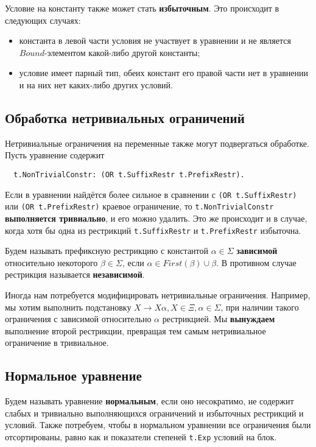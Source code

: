 \documentclass[12pt]{article}
\begin{document}
Условие на константу также может стать \textbf{избыточным}. Это происходит в
следующих случаях:
\begin{itemize}
  \item константа в левой части условия не участвует в уравнении и не является
  $Bound$-элементом какой-либо другой константы;
  \item условие имеет парный тип, обеих констант его правой части нет в
  уравнении и на них нет каких-либо других условий.
\end{itemize}

\subsection{Обработка нетривиальных ограничений}

Нетривиальные ограничения на переменные также могут подвергаться обработке.
Пусть уравнение содержит
\begin{Verbatim}
  t.NonTrivialConstr: (OR t.SuffixRestr t.PrefixRestr).
\end{Verbatim}
Если в уравнении найдётся более сильное в сравнении с
\texttt{(OR t.SuffixRestr)} или \texttt{(OR t.PrefixRestr)} краевое ограничение,
то \texttt{t.NonTrivialConstr} \textbf{выполняется тривиально}, и его можно
удалить. Это же происходит и в случае, когда хотя бы одна из рестрикций
\texttt{t.SuffixRestr} и \texttt{t.PrefixRestr} избыточна.

Будем называть префиксную рестрикцию с константой $\alpha \in \Sigma$
\textbf{зависимой} относительно некоторого $\beta \in \Sigma$, если
$\alpha \in First(\beta) \cup \beta$. В противном случае рестрикция называется
\textbf{независимой}.

Иногда нам потребуется модифицировать нетривиальные ограничения. Например, мы
хотим выполнить подстановку $X \to X \alpha, X \in \Xi, \alpha \in \Sigma$, при
наличии такого ограничения с зависимой относительно $\alpha$ рестрикцией. Мы
\textbf{вынуждаем} выполнение второй рестрикции, превращая тем самым
нетривиальное ограничение в тривиальное.

\subsection{Нормальное уравнение}

Будем называть уравнение \textbf{нормальным}, если оно несократимо, не содержит
слабых и тривиально выполняющихся ограничений и избыточных рестрикций и условий.
Также потребуем, чтобы в нормальном уравнении все ограничения были
отсортированы, равно как и показатели степеней \texttt{t.Exp} условий на блок.
\end{document}
